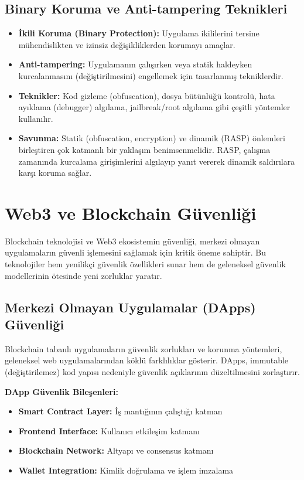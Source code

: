 \subsection{Binary Koruma ve Anti-tampering Teknikleri}
\begin{itemize}
\item \textbf{İkili Koruma (Binary Protection):} Uygulama ikililerini tersine mühendislikten ve izinsiz değişikliklerden korumayı amaçlar.
\item \textbf{Anti-tampering:} Uygulamanın çalışırken veya statik haldeyken kurcalanmasını (değiştirilmesini) engellemek için tasarlanmış tekniklerdir.
\item \textbf{Teknikler:} Kod gizleme (obfuscation), dosya bütünlüğü kontrolü, hata ayıklama (debugger) algılama, jailbreak/root algılama gibi çeşitli yöntemler kullanılır.
\item \textbf{Savunma:} Statik (obfuscation, encryption) ve dinamik (RASP) önlemleri birleştiren çok katmanlı bir yaklaşım benimsenmelidir. RASP, çalışma zamanında kurcalama girişimlerini algılayıp yanıt vererek dinamik saldırılara karşı koruma sağlar.
\end{itemize}

\section{Web3 ve Blockchain Güvenliği}

Blockchain teknolojisi ve Web3 ekosistemin güvenliği, merkezi olmayan uygulamaların güvenli işlemesini sağlamak için kritik öneme sahiptir. Bu teknolojiler hem yenilikçi güvenlik özellikleri sunar hem de geleneksel güvenlik modellerinin ötesinde yeni zorluklar yaratır.

\subsection{Merkezi Olmayan Uygulamalar (DApps) Güvenliği}

Blockchain tabanlı uygulamaların güvenlik zorlukları ve korunma yöntemleri, geleneksel web uygulamalarından köklü farklılıklar gösterir. DApps, immutable (değiştirilemez) kod yapısı nedeniyle güvenlik açıklarının düzeltilmesini zorlaştırır.

\textbf{DApp Güvenlik Bileşenleri:}
\begin{itemize}
    \item \textbf{Smart Contract Layer:} İş mantığının çalıştığı katman
    \item \textbf{Frontend Interface:} Kullanıcı etkileşim katmanı  
    \item \textbf{Blockchain Network:} Altyapı ve consensus katmanı
    \item \textbf{Wallet Integration:} Kimlik doğrulama ve işlem imzalama
\end{itemize}

